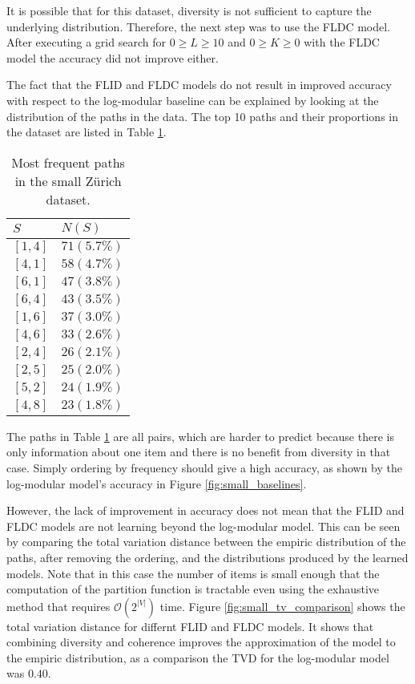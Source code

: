 It is possible that for this dataset, diversity is not sufficient to capture the underlying distribution. Therefore, the next step was to use the FLDC model. After executing a grid search for $0 \geq L \geq 10$ and $0 \geq K \geq 0$ with the FLDC model the accuracy did not improve either.

The fact that the FLID and FLDC models do not result in improved accuracy with respect to the log-modular baseline can be explained by looking at the distribution of the paths in the data. The top 10 paths and their proportions in the dataset are listed in Table \ref{tab:small_top_paths}.

\begin{table}
  \centering
  \caption{Most frequent paths in the small Zürich dataset.}
  \begin{tabular}{@{}ll@{}}
    \toprule
    $S$ & $N(S)$\\
    \midrule
    $[1,4]$ & $71 (5.7\%)$ \\
    $[4,1]$ & $58 (4.7\%)$ \\
    $[6,1]$ & $47 (3.8\%)$ \\
    $[6,4]$ & $43 (3.5\%)$ \\
    $[1,6]$ & $37 (3.0\%)$ \\
    $[4,6]$ & $33 (2.6\%)$ \\
    $[2,4]$ & $26 (2.1\%)$ \\
    $[2,5]$ & $25 (2.0\%)$ \\
    $[5,2]$ & $24 (1.9\%)$ \\
    $[4,8]$ & $23 (1.8\%)$ \\
    \bottomrule
  \end{tabular}
  \label{tab:small_top_paths}
\end{table}

The paths in Table \ref{tab:small_top_paths} are all pairs, which are harder to predict because there is only information about one item and there is no benefit from diversity in that case. Simply ordering by frequency should give a high accuracy, as shown by the log-modular model's accuracy in Figure \ref{fig:small_baselines}.

However, the lack of improvement in accuracy does not mean that the FLID and FLDC models are not learning beyond the log-modular model. This can be seen by comparing the total variation distance between the empiric distribution of the paths, after removing the ordering, and the distributions produced by the learned models. Note that in this case the number of items is small enough that the computation of the partition function is tractable even using the exhaustive method that requires $\mathcal{O}(2^|V|)$ time. Figure \ref{fig:small_tv_comparison} shows the total variation distance for differnt FLID and FLDC models. It shows that combining diversity and coherence improves the approximation of the model to the empiric distribution, as a comparison the TVD for the log-modular model was $0.40$.

